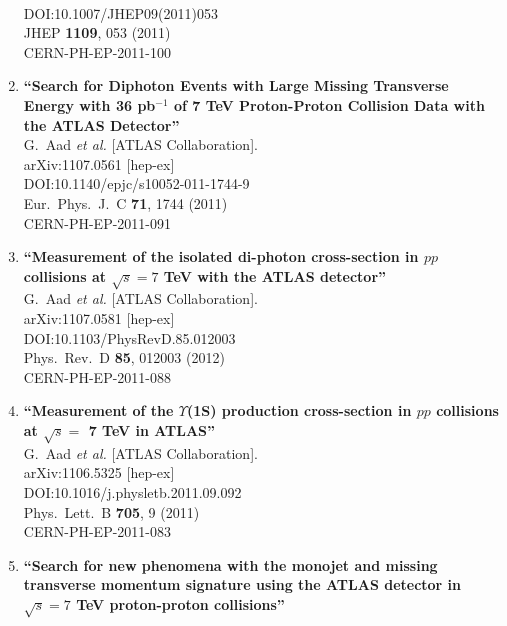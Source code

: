 \documentclass{article}
\begin{document}
\begin{enumerate}
  \\{}DOI:10.1007/JHEP09(2011)053
  \\{}JHEP {\bf 1109}, 053 (2011)
  \\{}CERN-PH-EP-2011-100
\item%
{\bf ``Search for Diphoton Events with Large Missing Transverse Energy with 36 pb$^{-1}$ of 7 TeV Proton-Proton Collision Data with the {ATLAS} Detector''}
  \\{}G.~Aad {\it et al.} [ATLAS Collaboration].
  \\{}arXiv:1107.0561 [hep-ex]
  \\{}DOI:10.1140/epjc/s10052-011-1744-9
  \\{}Eur.\ Phys.\ J.\ C {\bf 71}, 1744 (2011)
  \\{}CERN-PH-EP-2011-091
\item%
{\bf ``Measurement of the isolated di-photon cross-section in $pp$ collisions at $\sqrt{s}=7$ TeV with the ATLAS detector''}
  \\{}G.~Aad {\it et al.} [ATLAS Collaboration].
  \\{}arXiv:1107.0581 [hep-ex]
  \\{}DOI:10.1103/PhysRevD.85.012003
  \\{}Phys.\ Rev.\ D {\bf 85}, 012003 (2012)
  \\{}CERN-PH-EP-2011-088
\item%
{\bf ``Measurement of the $\Upsilon$(1S) production cross-section in $pp$ collisions at $\sqrt{s}=$ 7 TeV in ATLAS''}
  \\{}G.~Aad {\it et al.} [ATLAS Collaboration].
  \\{}arXiv:1106.5325 [hep-ex]
  \\{}DOI:10.1016/j.physletb.2011.09.092
  \\{}Phys.\ Lett.\ B {\bf 705}, 9 (2011)
  \\{}CERN-PH-EP-2011-083
\item%
{\bf ``Search for new phenomena with the monojet and missing transverse momentum signature using the ATLAS detector in $\sqrt{s}=7$ TeV proton-proton collisions''}

\end{enumerate}
\end{document}
